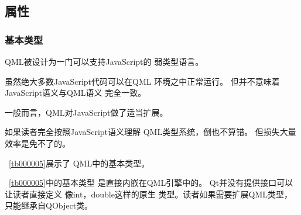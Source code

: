 ﻿




\FloatBarrier
\subsection{
属性
}\label{c000011s000000s01}



\FloatBarrier
\subsubsection{
基本类型
}\label{c000011s000000s01s01}


QML被设计为一门可以支持JavaScript的
弱类型语言。

虽然绝大多数JavaScript代码可以在QML
环境之中正常运行。
但并不意味着JavaScript语义与QML语义
完全一致。

一般而言，QML对JavaScript做了适当扩展。

如果读者完全按照JavaScript语义理解
QML类型系统，倒也不算错。
但损失大量效率是免不了的。

\tablename\ \ref{tb000005}展示了
QML中的基本类型。



\tablename\ \ref{tb000005}中的基本类型
是直接内嵌在QML引擎中的。
Qt并没有提供接口可以让读者直接定义
像int，double这样的原生
类型。读者如果需要扩展QML类型，只能继承自QObject类。











